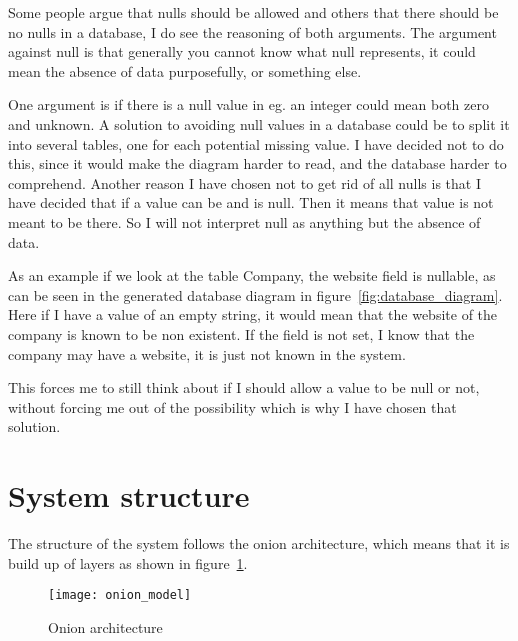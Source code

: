 Some people argue that nulls should be allowed and others that there should be
no nulls in a database\cite{stackexchange:db:nullfields}, I do see the reasoning
of both arguments. The argument against null is that generally you cannot know
what null represents, it could mean the absence of data purposefully, or
something else.

One argument is if there is a null value in eg. an integer could mean both zero
and unknown. A solution to avoiding null values in a database could be to split
it into several tables, one for each potential missing value. I have decided not
to do this, since it would make the diagram harder to read, and the database
harder to comprehend. Another reason I have chosen not to get rid of all nulls
is that I have decided that if a value can be and is null. Then it means that
value is not meant to be there. So I will not interpret null as anything but the
absence of data.

As an example if we look at the table Company, the website field is nullable, as
can be seen in the generated database diagram in figure~\ref{fig:database_diagram}.
Here if I have a value of an empty string, it would mean that the website of
the company is known to be non existent. If the field is not set, I know that
the company may have a website, it is just not known in the system.

This forces me to still think about if I should allow a value to be null or not,
without forcing me out of the possibility which is why I have chosen that
solution. 


\section{System structure}
\label{sec:System structure}
The structure of the system follows the onion
architecture\cite{onion_architecture}, which means that it is build up of layers
as shown in figure~\ref{fig:Onion architecture}. 

\begin{figure}[h]
  \centering
  \texttt{[image: onion\_model]}
  \caption[Onion architecture]{Onion architecture\protect\footnotemark}
  \label{fig:Onion architecture}
\end{figure}

